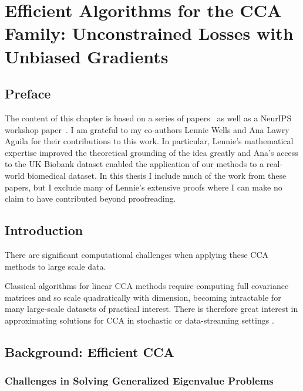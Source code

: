 \graphicspath{{chapters/gradient_descent/}}


\chapter{Efficient Algorithms for the CCA Family: Unconstrained Losses with Unbiased Gradients}\label{chap:gradient_descent}
\minitoc
\section*{Preface}
The content of this chapter is based on a series of papers~\citep{chapman2022generalized, chapman2023efficient} as well as a NeurIPS workshop paper~\citep{chapman2023cca}.
I am grateful to my co-authors Lennie Wells and Ana Lawry Aguila for their contributions to this work.
In particular, Lennie's mathematical expertise improved the theoretical grounding of the idea greatly and Ana's access to the UK Biobank dataset enabled the application of our methods to a real-world biomedical dataset.
In this thesis I include much of the work from these papers, but I exclude many of Lennie's extensive proofs where I can make no claim to have contributed beyond proofreading.

\section{Introduction}

There are significant computational challenges when applying these CCA methods to large scale data.



Classical algorithms for linear CCA methods require computing full covariance matrices and so scale quadratically with dimension, becoming intractable for many large-scale datasets of practical interest.
There is therefore great interest in approximating solutions for CCA in stochastic or data-streaming settings \citep{arora2012stochastic}.




\section{Background: Efficient CCA}\label{sec:background-unified}

\subsection{Challenges in Solving Generalized Eigenvalue Problems}

